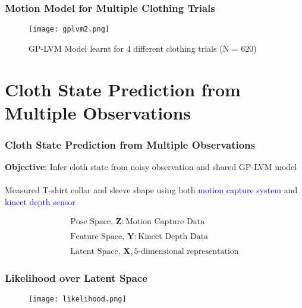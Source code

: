 \documentclass[10pt,handout]{beamer}
\begin{document}
\begin{frame}
\frametitle{Motion Model for Multiple Clothing Trials}

\begin{figure}
  \centering
  \caption*{GP-LVM Model learnt for 4 different clothing trials (N = 620)}
  \texttt{[image: gplvm2.png]}
\end{figure}

\end{frame}


\section[Prediction using Shared GP-LVM]{Cloth State Prediction from Multiple Observations}

\begin{frame}
\frametitle{Cloth State Prediction from Multiple Observations}

\centering
\textbf{Objective}: Infer cloth state from noisy observation and shared GP-LVM model\\~\\

\centering
Measured T-shirt collar and sleeve shape using both \textcolor{blue}{motion capture system} and \textcolor{blue}{kinect depth sensor}

\begin{equation*}
  \begin{array}{c}
    \text{Pose Space, } \mathbf{Z}: \text{Motion Capture Data}\\~\\
    \text{Feature Space, } \mathbf{Y}: \text{Kinect Depth Data}\\~\\
    \text{Latent Space, } \mathbf{X}, \text{5-dimensional representation}
  \end{array}
\end{equation*}

\end{frame}



\begin{frame}
\frametitle{Likelihood over Latent Space}

\begin{figure}
  \centering
  \texttt{[image: likelihood.png]}
\end{figure}

\end{frame}
\end{document}
